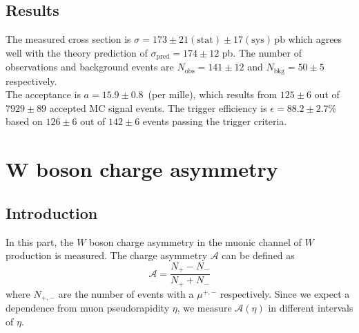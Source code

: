 \documentclass[11pt,a4paper]{article}
\begin{document}
\subsection{Results}
The measured cross section is $\sigma = 173 \pm 21 (\text{stat}) \pm 17 (\text{sys}) \, \text{pb}$ which agrees well with the theory prediction \cite{topxs} of $\sigma_\text{pred} = 174 \pm 12$ pb. The number of observations and background events are $ N_\text{obs} = 141 \pm 12$ and $N_\text{bkg} = 50 \pm 5$ respectively. \\
The acceptance is $ a = 15.9 \pm  0.8 $\textperthousand \ (per mille), which results from $125 \pm 6$ out of $7929 \pm 89$ accepted MC signal events. The trigger efficiency is $\epsilon = 88.2 \pm 2.7 \%$ based on $126 \pm 6$ out of $142 \pm 6$ events passing the trigger criteria. 

\pagebreak
\section{W boson charge asymmetry}
\subsection{Introduction}
In this part, the $W$ boson charge asymmetry in the muonic channel of $W$ production is measured. The charge asymmetry $\mathcal{A}$ can be defined as 
\begin{equation}
	\mathcal{A} = \frac{N_+ - N_-}{N_+ + N_-}
\end{equation}
where $N_{+,-}$ are the number of events with a $\mu^{+,-}$ respectively. Since we expect a dependence from muon pseudorapidity $\eta$, we measure $\mathcal{A}(\eta)$ in different intervals of $\eta$. 
\end{document}
